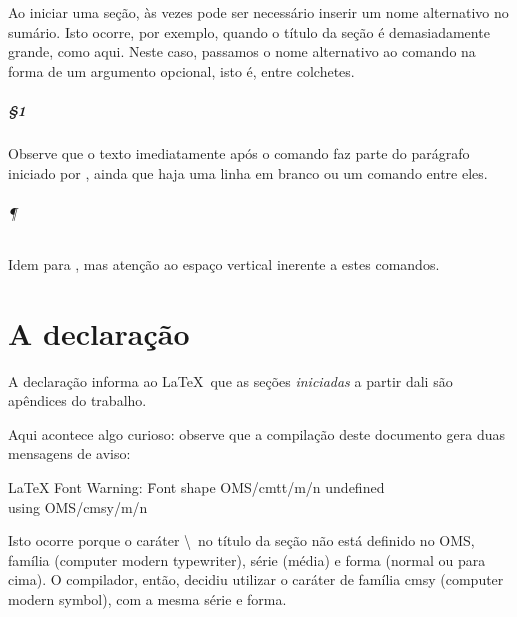 \documentclass[a4paper,12pt]{report}
\begin{document}
	Ao iniciar uma seção, às vezes pode ser necessário inserir um nome alternativo
	no sumário. Isto ocorre, por exemplo, quando o título da seção é demasiadamente
	grande, como aqui. Neste caso, passamos o nome alternativo ao comando
	 na forma de um argumento opcional, isto é, entre colchetes.
	
	\paragraph{\S1\textordmasculine}
	
	Observe que o texto imediatamente após o comando  faz parte do
	parágrafo iniciado por , ainda que haja uma linha em branco ou
	um comando  entre eles.
	
	\subparagraph{\P} Idem para , mas atenção ao espaço vertical
	inerente a estes comandos.
	
	\appendix
	\chapter{A declaração }\label{ap:rotulo}
	
	A declaração  informa ao \LaTeX\ que as seções \emph{iniciadas}
	a	partir dali são apêndices do trabalho.
	
	Aqui acontece algo curioso: observe que a compilação deste documento gera
	duas mensagens de aviso:

	\newlength\mylength
	\settowidth{}

	\begin{center}
		\begin{minipage}{\mylength}
			\ttfamily
			\begin{tabbing}
				LaTeX Font Warning: \=Font shape OMS/cmtt/m/n undefined\\
				                    \>using OMS/cmsy/m/n
			\end{tabbing}
		\end{minipage}
	\end{center}
	
	Isto ocorre porque o caráter \textbackslash\ no título da seção não está
	definido no  OMS, família  (computer modern
	typewriter), série  (média) e forma  (normal ou para
	cima). O compilador, então, decidiu utilizar o caráter de família cmsy
	(computer	modern symbol),	com a mesma série e forma.
	
\end{document}
